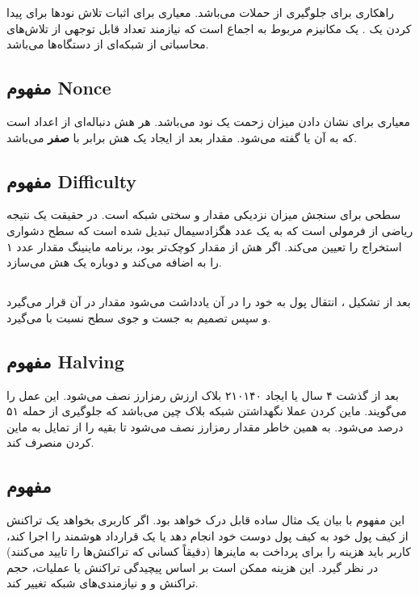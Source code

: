 \documentclass[10pt, a4paper]{article}
\begin{document}
راهکاری برای جلوگیری از حملات  می‌باشد. معیاری برای اثبات تلاش نود‌ها
برای پیدا کردن یک . یک مکانیزم مربوط به اجماع است که نیازمند تعداد
قابل توجهی از تلاش‌های محاسباتی از شبکه‌ای از دستگاه‌ها می‌باشد.

\subsection{مفهوم Nonce}

معیاری برای نشان دادن میزان زحمت یک نود می‌باشد. هر هش دنباله‌ای از اعداد است که
به آن  یا  گفته می‌شود. مقدار  بعد از
ایجاد یک هش برابر با \textbf{صفر} می‌باشد.

\subsection{مفهوم Difficulty}

سطحی برای سنجش میزان نزدیکی مقدار  و سختی شبکه است. در حقیقت یک نتیجه
ریاضی از فرمولی است که به یک عدد هگزادسیمال تبدیل شده است که سطح دشواری استخراج
را تعیین می‌کند. اگر هش از مقدار  کوچک‌تر بود، برنامه ماینینگ
مقدار عدد ۱ را به  اضافه می‌کند و دوباره یک هش می‌سازد.

\subsection{}

بعد از تشکیل ، انتقال پول به خود را در آن یادداشت می‌شود مقدار
 در آن قرار می‌گیرد و سپس تصمیم به جست و جوی سطح 
نسبت با  می‌گیرد.

\subsection{مفهوم Halving}

بعد از گذشت ۴ سال یا ایجاد ۲۱۰۱۴۰ بلاک ارزش رمزارز نصف می‌شود. این عمل را
 می‌گویند. ماین کردن عملا نگهداشتن شبکه بلاک چین می‌باشد که جلوگیری
از حمله ۵۱ درصد می‌شود. به همین خاطر مقدار رمزارز نصف می‌شود تا بقیه را از تمایل
به ماین کردن منصرف کند.

\subsection{مفهوم }

این مفهوم با بیان یک مثال ساده قابل درک خواهد بود. اگر کاربری بخواهد یک تراکنش
از کیف پول خود به کیف پول دوست خود انجام دهد یا یک قرارداد هوشمند را اجرا کند،
کاربر باید هزینه  را برای پرداخت به ماینر‌ها (دقیقاً کسانی که
تراکنش‌ها را تایید می‌کنند) در نظر گیرد. این هزینه ممکن است بر اساس پیچیدگی
تراکنش یا عملیات، حجم تراکنش و و نیازمندی‌های شبکه تغییر کند.
\end{document}
